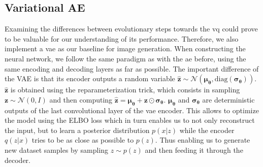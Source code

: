 \subsection{Variational AE}\label{subsec:variational-ae}
Examining the differences between evolutionary steps towards the \ac{vq} could prove to be valuable
for our understanding of its performance.
Therefore, we also implement a \ac{vae} as our baseline for image generation.
When constructing the neural network, we follow the same paradigm as with the \ac{ae} before, using the same
encoding and decoding layers as far as possible.
The important difference of the VAE is that its encoder outputs a random variable
$\boldsymbol{\hat{z}} \sim \mathcal{N}(\boldsymbol{\mu_\theta}, \text{diag}
(\boldsymbol{\sigma_\theta}))$. $\boldsymbol{\hat{z}}$ is obtained using the
reparameterization trick, which consists in sampling $\boldsymbol{z}
\sim \mathcal{N}(0, I)$ and then computing $\boldsymbol{\hat{z}} =
\boldsymbol{\mu_\theta} + \boldsymbol{z} \odot \boldsymbol{\sigma_\theta}$.
$\boldsymbol{\mu_\theta}$ and $\boldsymbol{\sigma_\theta}$ are deterministic
outputs of the last convolutional layer of the \ac{vae} encoder.
This allows to optimize the model using the ELBO loss which in turn enables us to not only
reconstruct the input, but to learn a posterior distribution $p(x|z)$ while
the encoder $q(z|x)$ tries to be as close as possible to $p(z)$.
Thus enabling us to generate new dataset samples by sampling $z \sim p(z)$ and then feeding
it through the decoder.